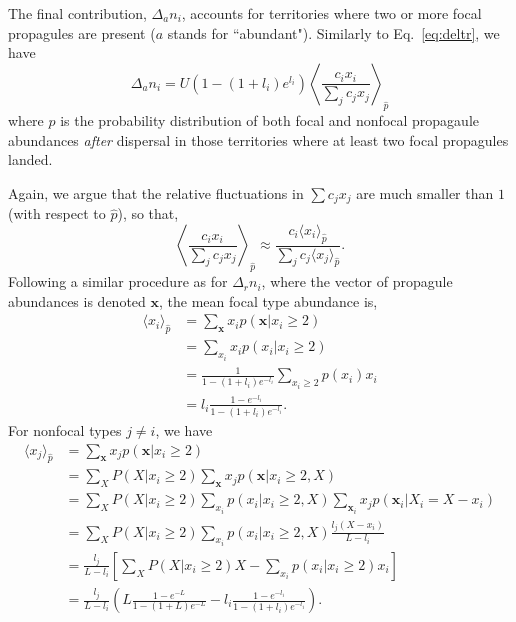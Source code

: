 \documentclass[11pt]{article}
\begin{document}
The final contribution, $\Delta_a n_i$, accounts for territories where two or more focal propagules are present ($a$ stands for ``abundant"). Similarly to Eq.~\eqref{eq:deltr}, we have 
\begin{equation}
\Delta_a n_i=U(1-(1+l_i)e^{l_i})\left\langle \frac{c_i x_i}{\sum_j c_j x_j} \right\rangle_{\hat{p}}\label{eq:delta}
\end{equation}
where $\hat{p}$ is the probability distribution of both focal and nonfocal propagaule abundances \textit{after} dispersal in those territories where at least two focal propagules landed. 

Again, we argue that the relative fluctuations in $\sum c_j x_j$ are much smaller than $1$ (with respect to $\hat{p}$), so that,
\begin{equation}
\left\langle \frac{c_i x_i}{\sum_j c_j x_j} \right\rangle_{\hat{p}}\approx  \frac{c_i \langle x_i \rangle_{\hat{p}}}{\sum_j c_j \langle x_j\rangle_{\hat{p}}}.\label{eq:meanfielda}
\end{equation}
Following a similar procedure as for $\Delta_r n_i$, where the vector of propagule abundances is denoted ${\mathbf x}$, the mean focal type abundance is, 
\begin{align}
\langle x_i \rangle_{\hat{p}}&=\sum_{\mathbf x} x_i p(\mathbf x|x_i\geq 2)\nonumber \\
&=\sum_{x_i} x_i p(x_i|x_i\geq 2) \nonumber\\
&=\frac{1}{1-(1+l_i)e^{-l_i}}\sum_{x_i\geq 2} p(x_i)x_i\nonumber\\
&=l_i\frac{1-e^{-l_i}}{1-(1+l_i)e^{-l_i}}.
\end{align}
For nonfocal types $j\neq i$, we have
\begin{align}
\langle x_j \rangle_{\hat{p}}&=\sum_{\mathbf x} x_j p(\mathbf x|x_i\geq 2)\nonumber \\
&=\sum_{X}P(X|x_i\geq 2)\sum_{\mathbf x} x_j p({\mathbf x}|x_i\geq 2,X)\nonumber\\
&=\sum_{X}P(X|x_i\geq 2)\sum_{x_i} p(x_i|x_i\geq 2,X) \sum_{\mathbf x_i} x_j p(\mathbf x_i|X_i=X-x_i)\nonumber\\
&=\sum_{X}P(X|x_i\geq 2)\sum_{x_i}p(x_i|x_i\geq 2,X) \frac{l_j(X-x_i)}{L-l_i} \nonumber\\
&=\frac{l_j}{L-l_i}\left[\sum_{X}P(X|x_i\geq 2)X - \sum_{x_i}p(x_i|x_i\geq 2) x_i \right]\nonumber\\
&=\frac{l_j}{L-l_i}\left( L\frac{1-e^{-L}}{1-(1+L)e^{-L}}- l_i\frac{1-e^{-l_i}}{1-(1+l_i)e^{-l_i}}\right). 
\end{align}
\end{document}
